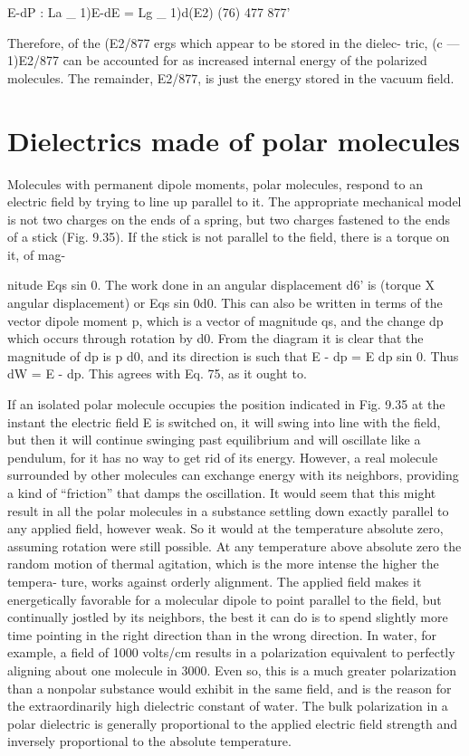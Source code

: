 \begin{equation}
\end{equation}
E-dP : La _ 1)E-dE = Lg _ 1)d(E2) (76)
477 877'

Therefore, of the (E2/877 ergs which appear to be stored in the dielec-
tric, (c  ---  1)E2/877 can be accounted for as increased internal energy
of the polarized molecules. The remainder, E2/877, is just the energy
stored in the vacuum field.

\section{Dielectrics made of polar molecules}

Molecules with permanent dipole moments, polar molecules,
respond to an electric field by trying to line up parallel to it. The
appropriate mechanical model is not two charges on the ends of a
spring, but two charges fastened to the ends of a stick (Fig. 9.35).
If the stick is not parallel to the field, there is a torque on it, of mag-

nitude Eqs sin 0. The work done in an angular displacement d6' is
(torque X angular displacement) or Eqs sin 0d0. This can also
be written in terms of the vector dipole moment p, which is a vector
of magnitude qs, and the change dp which occurs through rotation
by d0. From the diagram it is clear that the magnitude of dp is p d0,
and its direction is such that E - dp = E dp sin 0. Thus dW = E - dp.
This agrees with Eq. 75, as it ought to.

If an isolated polar molecule occupies the position indicated in
Fig. 9.35 at the instant the electric field E is switched on, it will swing
into line with the field, but then it will continue swinging past equilibrium
and will oscillate like a pendulum, for it has no way to get
rid of its energy. However, a real molecule surrounded by other
molecules can exchange energy with its neighbors, providing a kind
of ``friction'' that damps the oscillation. It would seem that this
might result in all the polar molecules in a substance settling down
exactly parallel to any applied field, however weak. So it would at
the temperature absolute zero, assuming rotation were still possible.
At any temperature above absolute zero the random motion of
thermal agitation, which is the more intense the higher the tempera-
ture, works against orderly alignment. The applied field makes it
energetically favorable for a molecular dipole to point parallel to
the field, but continually jostled by its neighbors, the best it can do
is to spend slightly more time pointing in the right direction than in
the wrong direction. In water, for example, a field of 1000 volts/cm
results in a polarization equivalent to perfectly aligning about one
molecule in 3000. Even so, this is a much greater polarization than
a nonpolar substance would exhibit in the same field, and is the
reason for the extraordinarily high dielectric constant of water. The
bulk polarization in a polar dielectric is generally proportional to
the applied electric field strength and inversely proportional to the
absolute temperature.

